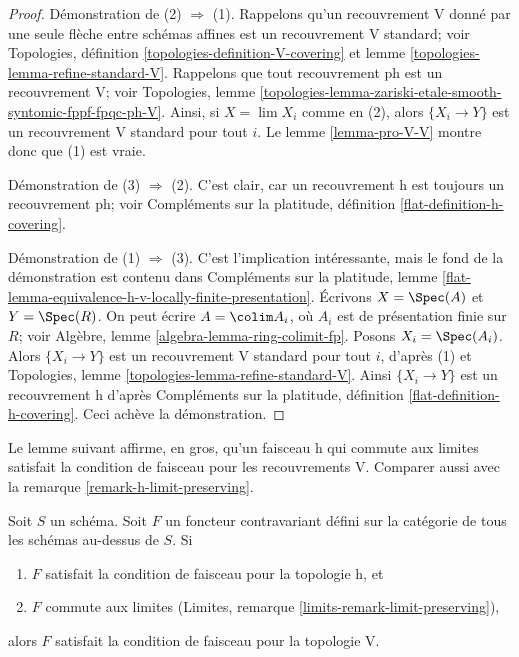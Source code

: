\begin{proof}
Démonstration de (2) $\Rightarrow$ (1). Rappelons qu'un recouvrement V donné par une
seule flèche entre schémas affines est un recouvrement V standard; voir
Topologies, définition \ref{topologies-definition-V-covering} et
lemme \ref{topologies-lemma-refine-standard-V}.
Rappelons que tout recouvrement ph est un recouvrement V; voir
Topologies, lemme
\ref{topologies-lemma-zariski-etale-smooth-syntomic-fppf-fpqc-ph-V}.
Ainsi, si $X = \lim X_i$ comme en (2), alors $\{X_i \to Y\}$
est un recouvrement V standard pour tout $i$. Le
lemme \ref{lemma-pro-V-V} montre donc que (1) est vraie.

\medskip\noindent
Démonstration de (3) $\Rightarrow$ (2). C'est clair, car un recouvrement h
est toujours un recouvrement ph; voir
Compléments sur la platitude, définition \ref{flat-definition-h-covering}.

\medskip\noindent
Démonstration de (1) $\Rightarrow$ (3). C'est l'implication intéressante, mais
le fond de la démonstration est contenu dans Compléments sur la platitude, lemme
\ref{flat-lemma-equivalence-h-v-locally-finite-presentation}.
Écrivons $X = \Spec(A)$ et $Y = \Spec(R)$. On peut écrire
$A = \colim A_i$, où $A_i$ est de présentation finie sur $R$; voir
Algèbre, lemme \ref{algebra-lemma-ring-colimit-fp}.
Posons $X_i = \Spec(A_i)$. Alors $\{X_i \to Y\}$ est un recouvrement V standard
pour tout $i$, d'après (1) et
Topologies, lemme \ref{topologies-lemma-refine-standard-V}.
Ainsi $\{X_i \to Y\}$ est un recouvrement h d'après
Compléments sur la platitude, définition \ref{flat-definition-h-covering}.
Ceci achève la démonstration.
\end{proof}

\noindent
Le lemme suivant affirme, en gros, qu'un faisceau h
qui commute aux limites satisfait la condition de faisceau pour les recouvrements V.
Comparer aussi avec la remarque \ref{remark-h-limit-preserving}.

\begin{lemma}
\label{lemma-h-limit-preserving}
Soit $S$ un schéma. Soit $F$ un foncteur contravariant défini
sur la catégorie de tous les schémas au-dessus de $S$. Si
\begin{enumerate}
\item $F$ satisfait la condition de faisceau pour la topologie h, et
\item $F$ commute aux limites
(Limites, remarque \ref{limits-remark-limit-preserving}),
\end{enumerate}
alors $F$ satisfait la condition de faisceau pour la topologie V.
\end{lemma}

